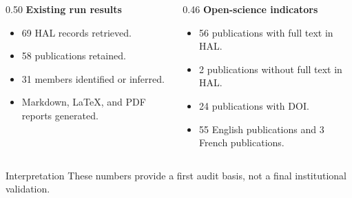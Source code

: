\begin{frame}[t]

  \begin{columns}[T,onlytextwidth]
    \begin{column}{0.50\textwidth}
      \textbf{Existing run results}
      \begin{itemize}
        \item 69 HAL records retrieved.
        \item 58 publications retained.
        \item 31 members identified or inferred.
        \item Markdown, LaTeX, and PDF reports generated.
      \end{itemize}
    \end{column}

    \begin{column}{0.46\textwidth}
      \textbf{Open-science indicators}
      \begin{itemize}
        \item 56 publications with full text in HAL.
        \item 2 publications without full text in HAL.
        \item 24 publications with DOI.
        \item 55 English publications and 3 French publications.
      \end{itemize}
    \end{column}
  \end{columns}

  \vspace{0.35cm}

  \begin{block}{Interpretation}
    These numbers provide a first audit basis, not a final institutional validation.
  \end{block}
\end{frame}

